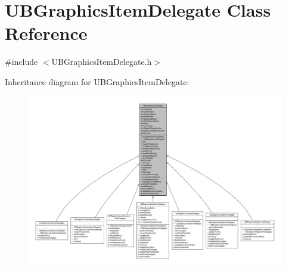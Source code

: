 \hypertarget{class_u_b_graphics_item_delegate}{\section{U\-B\-Graphics\-Item\-Delegate Class Reference}
\label{dd/dd5/class_u_b_graphics_item_delegate}
}


{\ttfamily \#include $<$U\-B\-Graphics\-Item\-Delegate.\-h$>$}



Inheritance diagram for U\-B\-Graphics\-Item\-Delegate\-:
\nopagebreak
\begin{figure}[H]
\begin{center}
\leavevmode
\includegraphics[width=350pt]{d1/d6b/class_u_b_graphics_item_delegate__inherit__graph}
\end{center}
\end{figure}


